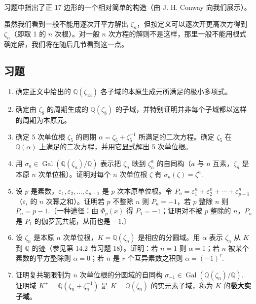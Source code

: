 习题中指出了正 17 边形的一个相对简单的构造（由 J. H. Conway 向我们展示）。

虽然我们看到一般不能用逐次开平方解出 \(\zeta_n\)，但按定义可以逐次开更高次方得到 \(\zeta_n\)（即取 1 的 \(n\) 次根）。对一般 \(n\) 次方程的解则不是这样，那里一般不能用根式确定解，我们将在随后几节看到这一点。

\subsection*{习题}

\begin{enumerate}
\item 确定正文中给出的 \(\mathbb{Q}(\zeta_{13})\) 各子域的本原生成元所满足的极小多项式。

\item 确定由 \(\zeta_8\) 的周期生成的 \(\mathbb{Q}(\zeta_8)\) 的子域，并特别证明并非每个子域都以这样的周期为本原元。

\item 确定 5 次单位根 \(\zeta_5\) 的周期 \(\alpha = \zeta_5+\zeta_5^{-1}\) 所满足的二次方程。确定 \(\zeta_5\) 在 \(\mathbb{Q}(\alpha)\) 上满足的二次方程，并用它显式解出 5 次单位根。

\item 用 \(\sigma_a \in \operatorname{Gal}(\mathbb{Q}(\zeta_n)/\mathbb{Q})\) 表示把 \(\zeta_n\) 映到 \(\zeta_n^a\) 的自同构（\(a\) 与 \(n\) 互素，\(\zeta_n\) 是本原 \(n\) 次单位根）。证明对每个 \(n\) 次单位根 \(\zeta\) 有 \(\sigma_a(\zeta) = \zeta^a\).

\item 设 \(p\) 是素数，\(\varepsilon_1, \varepsilon_2, \ldots, \varepsilon_{p-1}\) 是 \(p\) 次本原单位根。令 \(P_n = \varepsilon_1^n+\varepsilon_2^n+\cdots+\varepsilon_{p-1}^n\)（\(\varepsilon_i\) 的 \(n\) 次幂之和）。证明若 \(p\) 不整除 \(n\) 则 \(P_n = -1\)，若 \(p\) 整除 \(n\) 则 \(P_n = p-1\).〔一种途径：由 \(\Phi_p(x)\) 得 \(P_1 = -1\)；证明对不被 \(p\) 整除的 \(n\)，\(P_n\) 是 \(P_1\) 的伽罗瓦共轭，从而也是 \(-1\).〕

\item 设 \(\zeta_n\) 是本原 \(n\) 次单位根，\(K = \mathbb{Q}(\zeta_n)\) 是相应的分圆域。用 \(\alpha\) 表示 \(\zeta_n\) 从 \(K\) 到 \(\mathbb{Q}\) 的迹（参见第 14.2 节习题 18）。证明：若 \(n = 1\) 则 \(\alpha = 1\)；若 \(n\) 被某个素数的平方整除则 \(\alpha = 0\)；若 \(n\) 是 \(r\) 个互异素数之积则 \(\alpha = (-1)^r\).

\item 证明复共轭限制为 \(n\) 次单位根的分圆域的自同构 \(\sigma_{-1} \in \operatorname{Gal}(\mathbb{Q}(\zeta_n)/\mathbb{Q})\). 证明域 \(K^+ = \mathbb{Q}(\zeta_n+\zeta_n^{-1})\) 是 \(K = \mathbb{Q}(\zeta_n)\) 的实元素子域，称为 \(K\) 的\textbf{极大实子域}。


\end{enumerate}
